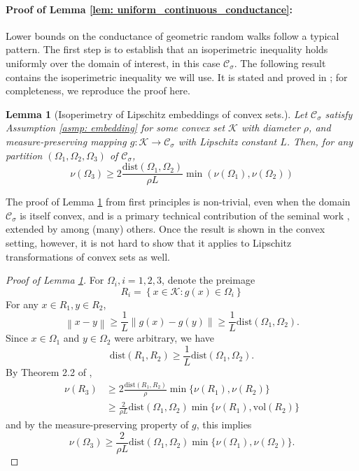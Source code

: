 \documentclass[11pt,twoside]{article}
\newtheorem{lemma}{Lemma}
\theoremstyle{definition}
\newcommand{\set}[1]{\left\{#1\right\}}
\newcommand{\vol}{\mathrm{vol}}
\newcommand{\norm}[1]{\left\lVert#1\right\rVert}
\newcommand{\1}{\mathbbm{1}}
\newcommand{\dist}{\mathrm{dist}}
\newcommand{\Cset}{\mathcal{C}}
\newcommand{\Csig}{\Cset_{\sigma}}
\begin{document}
\paragraph{Proof of Lemma \ref{lem: uniform_continuous_conductance}:}
Lower bounds on the conductance of geometric random walks follow a typical pattern. The first step is to establish that an isoperimetric inequality holds uniformly over the domain of interest, in this case $\Csig$. The following result contains the isoperimetric inequality we will use. It is stated and proved in \cite{abbasi-yadkori2016a}; for completeness, we reproduce the proof here.
\begin{lemma}[Isoperimetry of Lipschitz embeddings of convex sets.]
	\label{lem: nonconvex_isoperimetry}
	Let $\Csig$ satisfy Assumption \ref{asmp: embedding} for some convex set $\mathcal{K}$ with diameter $\rho$, and measure-preserving mapping $g: \mathcal{K} \to \Csig$ with Lipschitz constant $L$. Then, for any partition $(\Omega_1,\Omega_2,\Omega_3)$ of $\Csig$, 
	\begin{equation*}
	\nu(\Omega_3) \geq 2\frac{\dist(\Omega_1, \Omega_2)}{\rho L} \min(\nu(\Omega_1), \nu(\Omega_2))
	\end{equation*}
\end{lemma}
The proof of Lemma \ref{lem: nonconvex_isoperimetry} from first principles is non-trivial, even when the domain $\Csig$ is itself convex, and is a primary technical contribution of the seminal work \cite{lovasz1990}, extended by \cite{dyer1991} among (many) others. Once the result is shown in the convex setting, however, it is not hard to show that it applies to Lipschitz transformations of convex sets as well.
\begin{proof}[Proof of Lemma \ref{lem: nonconvex_isoperimetry}]
	For $\Omega_i, i = 1,2,3$, denote the preimage
	\begin{equation*}
	R_i = \set{x \in \mathcal{K}: g(x) \in \Omega_i}
	\end{equation*}
	For any $x \in R_1, y \in R_2$, 
	\begin{equation*}
	\norm{x - y} \geq \frac{1}{L}\norm{g(x) - g(y)} \geq \frac{1}{L} \dist(\Omega_1, \Omega_2). 
	\end{equation*}
	Since $x \in \Omega_1$ and $y \in \Omega_2$ were arbitrary, we have
	\begin{equation*}
	\dist(R_1, R_2) \geq \frac{1}{L} \dist(\Omega_1, \Omega_2).
	\end{equation*}
	By Theorem 2.2 of \cite{lovasz1990},
	\begin{align*}
	\nu(R_3) & \geq 2\frac{\dist(R_1, R_2)}{\rho} \min \{\nu(R_1), \nu(R_2)\} \\
	& \geq \frac{2}{\rho L} \dist(\Omega_1, \Omega_2) \min\{\nu(R_1), \vol(R_2)\}
	\end{align*}
	and by the measure-preserving property of $g$, this implies
	\begin{equation*}
	\nu(\Omega_3) \geq\frac{2}{\rho L} \dist(\Omega_1, \Omega_2) \min\{\nu(\Omega_1), \nu(\Omega_2)\}.
	\end{equation*}
\end{proof}
\end{document}

